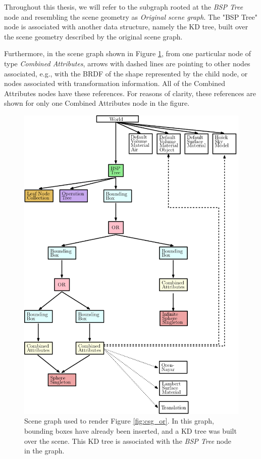 Throughout this thesis, we will refer to the subgraph rooted at the \emph{BSP Tree} node and resembling the scene geometry as \emph{Original scene graph}. The "BSP Tree" node is associated with another data structure, namely the KD tree, built over the scene geometry described by the original scene graph.  

Furthermore, in the scene graph shown in Figure \ref{fig:scene_graph}, from one particular node of type \emph{Combined Attributes}, arrows with dashed lines are pointing to other nodes associated, e.g., with the BRDF of the shape represented by the child node, or nodes associated with transformation information. All of the Combined Attributes nodes have these references. For reasons of clarity, these references are shown for only one Combined Attributes node in the figure.

\begin{figure}[H]
	\centering	
	\includegraphics[width=1\linewidth]{img/2 art/scene_graph.png}
	\caption{Scene graph used to render Figure \ref{fig:csg_or}. In this graph, bounding boxes have already been inserted, and a KD tree was built over the scene. This KD tree is associated with the \emph{BSP Tree} node in the graph.} 
	\label{fig:scene_graph}
\end{figure}

